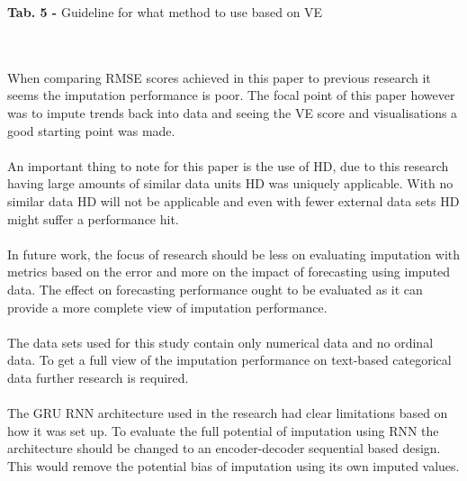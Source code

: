\documentclass[9.5pt,article,twocolumn]{article}
\begin{document}
\begin{flushleft}
\begingroup
    \fontsize{9pt}{9pt}\selectfont
    \textbf{Tab. 5 -} Guideline for what method to use based on VE
\endgroup
\end{flushleft}
\\
\\
When comparing RMSE scores achieved in this paper to previous research it seems the imputation performance is poor. The focal point of this paper however was to impute trends back into data and seeing the VE score and visualisations a good starting point was made.
\\
\\
An important thing to note for this paper is the use of HD, due to this research having large amounts of similar data units HD was uniquely applicable. With no similar data HD will not be applicable and even with fewer external data sets HD might suffer a performance hit.
\\
\\
In future work, the focus of research should be less on evaluating imputation with metrics based on the error and more on the impact of forecasting using imputed data. The effect on forecasting performance ought to be evaluated as it can provide a more complete view of imputation performance. 
\\
\\
The data sets used for this study contain only numerical data and no ordinal data. To get a full view of the imputation performance on text-based categorical data further research is required.
\\
\\
The GRU RNN architecture used in the research had clear limitations based on how it was set up. To evaluate the full potential of imputation using RNN the architecture should be changed to an encoder-decoder sequential based design. This would remove the potential bias of imputation using its own imputed values.
\end{document}

